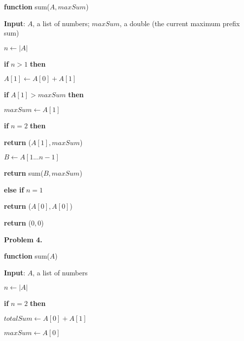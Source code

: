 \documentclass{article}
\begin{document}
\hspace{0ex}	\textbf{function} sum($A, maxSum$)

\hspace{4ex}		\textbf{Input}: $A$, a list of numbers; $maxSum$, a double (the current maximum prefix sum)

\hspace{4ex}		$n \leftarrow |A|$

\hspace{4ex}		\textbf{if} $n > 1$ \textbf{then}

\hspace{8ex}			$A[1] \leftarrow A[0] + A[1]$

\hspace{8ex}			\textbf{if} $A[1] > maxSum$ \textbf{then}

\hspace{12ex}				$maxSum \leftarrow A[1]$

\hspace{8ex}			\textbf{if} $n = 2$ \textbf{then}

\hspace{12ex}				\textbf{return} ($A[1], maxSum$)

\hspace{8ex}			$B \leftarrow A[1 ... n - 1]$

\hspace{8ex}			\textbf{return} sum($B, maxSum$)

\hspace{4ex}		\textbf{else if} $n = 1$

\hspace{8ex}			\textbf{return} ($A[0], A[0]$)

\hspace{4ex}		\textbf{return} ($0, 0$)


\newpage

\textbf{Problem 4.}

\hspace{0ex}	\textbf{function} sum($A$)

\hspace{4ex}		\textbf{Input}: $A$, a list of numbers

\hspace{4ex}		$n \leftarrow |A|$

\hspace{4ex}		\textbf{if} $n = 2$ \textbf{then}

\hspace{8ex}			$totalSum \leftarrow A[0] + A[1]$

\hspace{8ex}			$maxSum \leftarrow A[0]$
\end{document}
